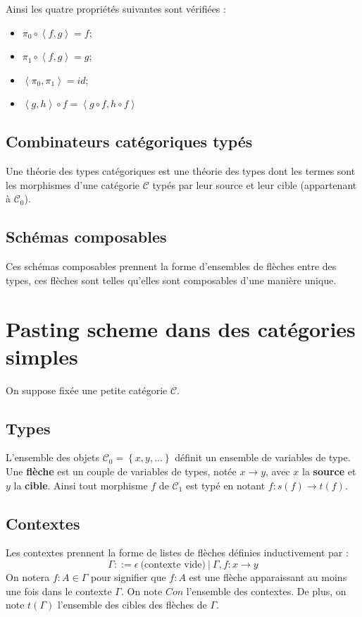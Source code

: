 \documentclass[conference]{IEEEtran}
\begin{document}
Ainsi les quatre propriétés suivantes sont vérifiées :
\begin{itemize}
	\item $\pi_0 \circ \left<f, g\right> = f$;
	\item $\pi_1 \circ \left<f, g\right> = g$;
	\item $\left<\pi_0, \pi_1\right> = id$;
	\item $\left<g , h\right> \circ f = \left<g \circ f, h \circ f\right>$
\end{itemize}

\subsection{Combinateurs catégoriques typés} Une théorie des types catégoriques est une théorie des types dont les termes sont les morphismes d'une catégorie $\mathcal{C}$ typés par leur source et leur cible (appartenant à $\mathcal{C}_0$).

\subsection{Schémas composables} Ces schémas composables prennent la forme d'ensembles de flèches entre des types, ces flèches sont telles qu'elles sont composables d'une manière unique. 

\section{Pasting scheme dans des catégories simples}

On suppose fixée une petite catégorie $\mathcal{C}$.

\subsection{Types} L'ensemble des objets $\mathcal{C}_0  = \left\{x, y, \dots\right\}$ définit un ensemble de variables de type. Une \textbf{flèche} est un couple de variables de types, notée $x \rightarrow y$, avec $x$ la \textbf{source} et $y$ la \textbf{cible}. Ainsi tout morphisme $f$ de $\mathcal{C}_1$ est typé en notant $f : s(f) \rightarrow t(f)$.

\subsection{Contextes} Les contextes prennent la forme de listes de flèches définies inductivement par : $$ \Gamma ::= \epsilon \ \text{(contexte vide)} \ |\ \Gamma , f : x \rightarrow y$$
On notera $f : A \in \Gamma$ pour signifier que $f : A$ est une flèche apparaissant au moins une fois dans le contexte $\Gamma$. On note $Con$ l'ensemble des contextes. De plus, on note $t(\Gamma)$ l'ensemble des cibles des flèches de $\Gamma$.
\end{document}
